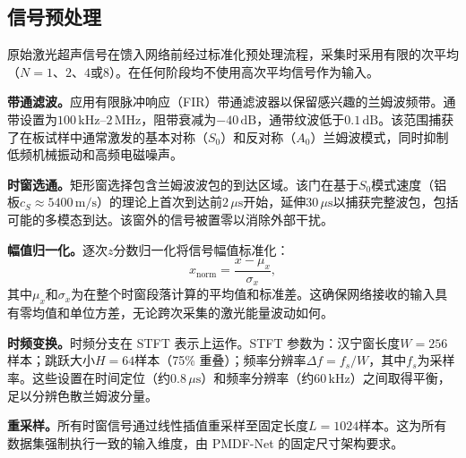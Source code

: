 \subsection{信号预处理}
\label{sec:preprocessing}

原始激光超声信号在馈入网络前经过标准化预处理流程，采集时采用有限的次平均（$N = 1$、$2$、$4$或$8$）。在任何阶段均不使用高次平均信号作为输入。

\textbf{带通滤波。}应用有限脉冲响应（FIR）带通滤波器以保留感兴趣的兰姆波频带。通带设置为$100\,\text{kHz}$--$2\,\text{MHz}$，阻带衰减为$-40\,\text{dB}$，通带纹波低于$0.1\,\text{dB}$。该范围捕获了在板试样中通常激发的基本对称（$S_0$）和反对称（$A_0$）兰姆波模式，同时抑制低频机械振动和高频电磁噪声。

\textbf{时窗选通。}矩形窗选择包含兰姆波波包的到达区域。该门在基于$S_0$模式速度（铝板$c_S \approx 5400\,\text{m/s}$）的理论上首次到达前$2\,\mu\text{s}$开始，延伸$30\,\mu\text{s}$以捕获完整波包，包括可能的多模态到达。该窗外的信号被置零以消除外部干扰。

\textbf{幅值归一化。}逐次$z$分数归一化将信号幅值标准化：
\begin{equation}
x_{\text{norm}} = \frac{x - \mu_x}{\sigma_x},
\end{equation}
其中$\mu_x$和$\sigma_x$为在整个时窗段落计算的平均值和标准差。这确保网络接收的输入具有零均值和单位方差，无论跨次采集的激光能量波动如何。

\textbf{时频变换。}时频分支在 STFT 表示上运作。STFT 参数为：汉宁窗长度$W = 256$样本；跳跃大小$H = 64$样本（75\% 重叠）；频率分辨率$\Delta f = f_s / W$，其中$f_s$为采样率。这些设置在时间定位（约$0.8\,\mu\text{s}$）和频率分辨率（约$60\,\text{kHz}$）之间取得平衡，足以分辨色散兰姆波分量。

\textbf{重采样。}所有时窗信号通过线性插值重采样至固定长度$L = 1024$样本。这为所有数据集强制执行一致的输入维度，由 PMDF-Net 的固定尺寸架构要求。